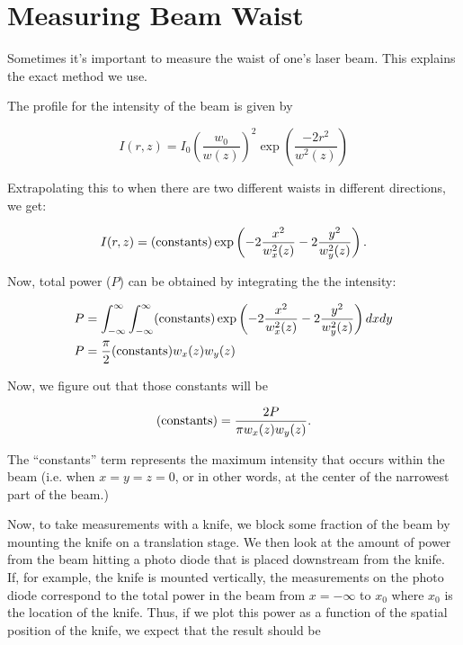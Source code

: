 \chapter{Measuring Beam Waist}
\label{BeamWaistAppendix}

Sometimes it's important to measure the waist of one's laser beam. This explains the exact method we use. 
  
The profile for the intensity of the beam is given by

\begin{equation} \label{electricFieldExplicitForm}
I(r,z)=I_0\left(\frac{w_0}{w(z)}\right)^2 \exp \left(\frac{-2 r^2}{w^2(z)}\right)
\end{equation}

Extrapolating this to when there are two different waists in different directions, we get: 

\begin{equation}
I(r,z)= ({\rm constants})\exp \left(-2\frac{x^2}{w_x^2(z)}-2\frac{y^2}{w_y^2(z)}\right) . 
\end{equation}

Now, total power ($P$) can be obtained by integrating the the intensity: 

\begin{align}
P&=\int_{-\infty}^{\infty}\int_{-\infty}^{\infty} ({\rm constants}) \exp \left(-2\frac{x^2}{w_x^2(z)}-2\frac{y^2}{w_y^2(z)}\right) dx dy\\
P&=\frac{\pi}{2} ({\rm constants}) w_x(z) w_y(z)
\end{align}

Now, we figure out that those constants will be

\begin{equation}
({\rm constants})=\frac{2 P}{\pi w_x(z) w_y(z)}.
\end{equation}

The ``constants'' term represents the maximum intensity that occurs within the beam (i.e. when $x=y=z=0$, or in other words, at the center of the narrowest part of the beam.)

Now, to take measurements with a knife, we block some fraction of the beam by mounting the knife on a translation stage. We then look at the amount of power from the beam hitting a photo diode that is placed downstream from the knife. If, for example, the knife is mounted vertically, the measurements on the photo diode correspond to the total power in the beam from $x=-\infty$ to $x_0$ where $x_0$ is the location of the knife. Thus, if we plot this power as a function of the spatial position of the knife, we expect that the result should be 

